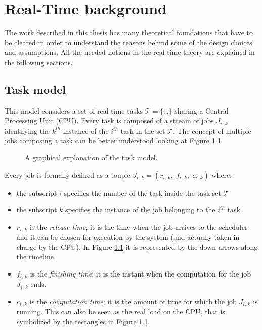 \chapter{Real-Time background} \label{cha:rt_background}

The work described in this thesis has many theoretical foundations that have to be
cleared in order to understand the reasons behind some of the design choices and
assumptions. All the needed notions in the real-time theory are explained in the
following sections.


\section{Task model} \label{sec:task_model}
This model considers a set of real-time tasks \( \mathcal{T} = \{\tau_{i}\} \)
sharing a Central Processing Unit (CPU). Every task
is composed of a stream of jobs \( J_{i,\,k} \) identifying the \( k^{th} \)
instance of the \( i^{th} \) task in the set \( \mathcal{T} \). The concept of multiple
jobs composing a task can be better understood looking at Figure \ref{img:task_model}.
\begin{figure}[!htb]
    \caption{A graphical explanation of the task model.}
    \label{img:task_model}
\end{figure}

Every job is formally defined as a touple
\( J_{i,\,k} = \left(r_{i,\,k}, \;f_{i,\,k}, \;c_{i,\,k}\right) \) where:
\begin{itemize}
    \item the subscript \( i \) specifies the number of the task inside the task 
        set \( \mathcal{T} \)
    \item the subscript \( k \) specifies the instance of the job belonging to
        the \( i^{th} \) task
    \item \( r_{i,\,k} \) is the \emph{release time}; it is the time when
        the job arrives to the scheduler and it can be chosen for execution
        by the system (and actually taken in charge by the CPU). In Figure
        \ref{img:task_model} it is represented by the down arrows along the
        timeline.
    \item \( f_{i,\,k} \) is the \emph{finishing time}; it is the instant when
        the computation for the job \( J_{i,\,k} \) ends.
    \item \( c_{i,\,k} \) is the \emph{computation time}; it is the amount of
        time for which the job \( J_{i,\,k} \) is running. This can also be seen
        as the real load on the CPU, that is symbolized by the rectangles
        in Figure \ref{img:task_model}.
\end{itemize} 

